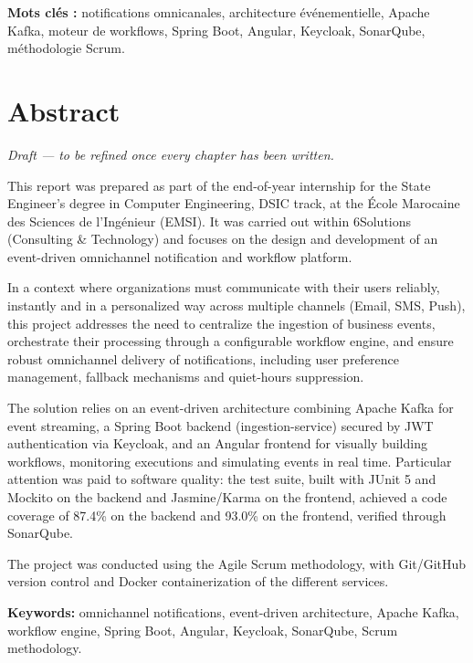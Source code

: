 \documentclass[12pt,a4paper]{report}
\begin{document}
\medskip
\noindent\textbf{Mots clés :} notifications omnicanales, architecture événementielle, Apache Kafka, moteur de workflows, Spring Boot, Angular, Keycloak, SonarQube, méthodologie Scrum.

\chapter*{Abstract}

\textcolor{placeholderred}{\itshape Draft --- to be refined once every chapter has been written.}

\bigskip

This report was prepared as part of the end-of-year internship for the State Engineer's degree in Computer Engineering, DSIC track, at the École Marocaine des Sciences de l'Ingénieur (EMSI). It was carried out within 6Solutions (Consulting \& Technology) and focuses on the design and development of an event-driven omnichannel notification and workflow platform.

In a context where organizations must communicate with their users reliably, instantly and in a personalized way across multiple channels (Email, SMS, Push), this project addresses the need to centralize the ingestion of business events, orchestrate their processing through a configurable workflow engine, and ensure robust omnichannel delivery of notifications, including user preference management, fallback mechanisms and quiet-hours suppression.

The solution relies on an event-driven architecture combining Apache Kafka for event streaming, a Spring Boot backend (ingestion-service) secured by JWT authentication via Keycloak, and an Angular frontend for visually building workflows, monitoring executions and simulating events in real time. Particular attention was paid to software quality: the test suite, built with JUnit 5 and Mockito on the backend and Jasmine/Karma on the frontend, achieved a code coverage of 87.4\% on the backend and 93.0\% on the frontend, verified through SonarQube.

The project was conducted using the Agile Scrum methodology, with Git/GitHub version control and Docker containerization of the different services.

\medskip
\noindent\textbf{Keywords:} omnichannel notifications, event-driven architecture, Apache Kafka, workflow engine, Spring Boot, Angular, Keycloak, SonarQube, Scrum methodology.
\end{document}
